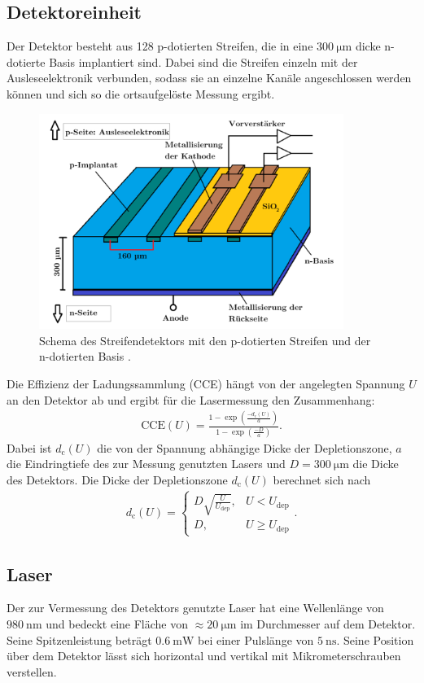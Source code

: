 \subsection{Detektoreinheit}
Der Detektor besteht aus 128 p-dotierten Streifen, die in eine $\SI{300}{\micro\meter}$ dicke n-dotierte Basis implantiert sind.
Dabei sind die Streifen einzeln mit der Ausleseelektronik verbunden, sodass sie an einzelne Kanäle angeschlossen werden können und sich so die ortsaufgelöste Messung ergibt.
\begin{figure}
  \centering
  \includegraphics[height=7cm]{TimosAufrisse/detektorStreifen.png}
  \caption{Schema des Streifendetektors mit den p-dotierten Streifen und der n-dotierten Basis \cite{anleitung}.}
  \label{fig:detektorStreifen}
\end{figure}
Die Effizienz der Ladungssammlung (CCE) hängt von der angelegten Spannung $U$ an den Detektor ab und ergibt für die Lasermessung den Zusammenhang:
\begin{align}
  \text{CCE}(U) = \frac{1-\exp(\frac{-d_\text{c}(U)}{a})}{1-\exp(\frac{-D}{a})}.
  \label{eqn:cce}
\end{align}
Dabei ist $d_\text{c}(U)$ die von der Spannung abhängige Dicke der Depletionszone, $a$ die Eindringtiefe des zur Messung genutzten Lasers und $D = \SI{300}{\micro\meter}$ die Dicke des Detektors.
Die Dicke der Depletionszone $d_\text{c}(U)$ berechnet sich nach
\begin{align}
  d_\text{c}(U) =
  \begin{cases}
    D \sqrt{\frac{U}{U_\text{dep}}}, & U < U_\text{dep}\\
    D, & U \geq U_\text{dep}
  \end{cases}.
\end{align}

\subsection{Laser}
Der zur Vermessung des Detektors genutzte Laser hat eine Wellenlänge von $\SI{980}{\nano\meter}$ und bedeckt eine Fläche von $\approx \SI{20}{\micro\meter}$ im Durchmesser auf dem Detektor. Seine Spitzenleistung beträgt $\SI{0.6}{\milli\watt}$ bei einer Pulslänge von $\SI{5}{\nano\second}$. Seine Position über dem Detektor lässt sich horizontal und vertikal mit Mikrometerschrauben verstellen.


